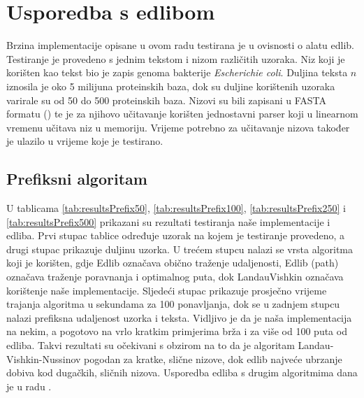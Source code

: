 \documentclass[times, utf8, zavrsni]{fer}
\begin{document}
\section{Usporedba s edlibom}
Brzina implementacije opisane u ovom radu testirana je u ovisnosti o alatu edlib. Testiranje je provedeno s jednim tekstom i nizom različitih uzoraka. Niz koji je korišten kao tekst bio je zapis genoma bakterije \textit{Escherichie coli}. Duljina teksta $n$ iznosila je oko 5 milijuna proteinskih baza, dok su duljine korištenih uzoraka varirale su od 50 do 500 proteinskih baza. Nizovi su bili zapisani u FASTA formatu (\cite{FASTA}) te je za njihovo učitavanje korišten jednostavni parser koji u linearnom vremenu učitava niz u memoriju. Vrijeme potrebno za učitavanje nizova također je ulazilo u vrijeme koje je testirano.
\subsection{Prefiksni algoritam}
U tablicama \ref{tab:resultsPrefix50}, \ref{tab:resultsPrefix100}, \ref{tab:resultsPrefix250} i \ref{tab:resultsPrefix500} prikazani su rezultati testiranja naše implementacije i edliba. Prvi stupac tablice određuje uzorak na kojem je testiranje provedeno, a drugi stupac prikazuje duljinu uzorka. U trećem stupcu nalazi se vrsta algoritma koji je korišten, gdje Edlib označava obično traženje udaljenosti, Edlib (path) označava traženje poravnanja i optimalnog puta, dok LandauVishkin označava korištenje naše implementacije. Sljedeći stupac prikazuje prosječno vrijeme trajanja algoritma u sekundama za 100 ponavljanja, dok se u zadnjem stupcu nalazi prefiksna udaljenost uzorka i teksta. Vidljivo je da je naša implementacija na nekim, a pogotovo na vrlo kratkim primjerima brža i za više od 100 puta od edliba. Takvi rezultati su očekivani s obzirom na to da je algoritam Landau-Vishkin-Nussinov pogodan za kratke, slične nizove, dok edlib najveće ubrzanje dobiva kod dugačkih, sličnih nizova. Usporedba edliba s drugim algoritmima dana je u radu \cite{edlib}.
\end{document}
